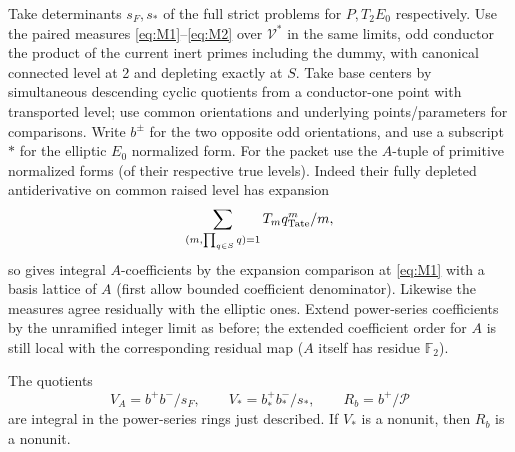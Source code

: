 Take determinants \(s_F,s_*\) of the full strict problems for \(P,T_2E_0\) respectively. Use the paired measures \eqref{eq:M1}--\eqref{eq:M2} over \(\mathcal V^*\) in the same limits, odd conductor the product of the current inert primes including the dummy, with canonical connected level at 2 and depleting exactly at \(S\). Take base centers by simultaneous descending cyclic quotients from a conductor-one point with transported level; use common orientations and underlying points/parameters for comparisons. Write \(b^\pm\) for the two opposite odd orientations, and use a subscript \(*\) for the elliptic \(E_0\) normalized form. For the packet use the \(A\)-tuple of primitive normalized forms (of their respective true levels). Indeed their fully depleted antiderivative on common raised level has expansion
\[
                         \sum_{(m,\prod_{q\in S}q)=1} T_m q_{\rm Tate}^m/m,
\]
so gives integral \(A\)-coefficients by the expansion comparison at \eqref{eq:M1} with a basis lattice of \(A\) (first allow bounded coefficient denominator). Likewise the measures agree residually with the elliptic ones. Extend power-series coefficients by the unramified integer limit as before; the extended coefficient order for \(A\) is still local with the corresponding residual map (\(A\) itself has residue \(\mathbb F_2\)).

\begin{proposition}\label{real:division}
The quotients
\[
 V_A=b^+ b^- /s_F,\qquad V_*=b_*^+ b_*^-/s_*,\qquad R_b=b^+/\mathcal P
                                                                        \tag{R3}\label{eq:R3}
\]
are integral in the power-series rings just described. If \(V_*\)
is a nonunit, then \(R_b\) is a nonunit.
\end{proposition}

